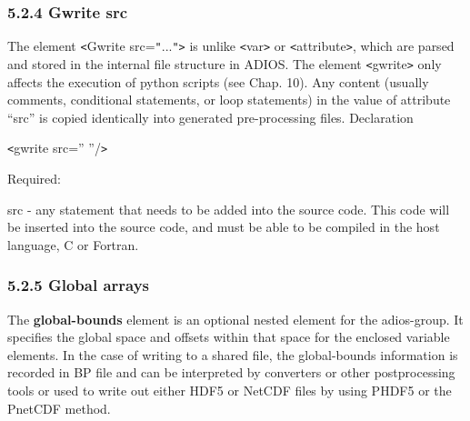 \vspace{10pt}
\subsubsection*{{\large \textbf{5.2.4 Gwrite src}}}

\vspace{10pt}
\leftskip=0pt
\parindent=0pt
The element \texttt{<}Gwrite src=\texttt{"}...\texttt{"}\texttt{>} is unlike \texttt{<}var\texttt{>} 
or \texttt{<}attribute\texttt{>}, which are parsed and stored in the internal file 
structure in ADIOS. The element \texttt{<}gwrite\texttt{>} only affects the execution 
of python scripts (see Chap. 10). Any content (usually comments, conditional statements, 
or loop statements) in the value of attribute ``src'' is copied identically into 
generated pre-processing files. Declaration

\vspace{10pt}
\texttt{<}gwrite src=''    ''/\texttt{>}

\vspace{10pt}
Required:

\vspace{10pt}
\leftskip=18pt
\parindent=3pt
src -  any statement that needs to be added into the source code. This code will 
be inserted into the source code, and must be able to be compiled in the host language, 
C or Fortran. \label{HToc84890247}\label{HToc212016623}\label{HToc212016865}\label{HRef278371183}\label{HToc182553370}

\vspace{10pt}
\subsubsection*{{\large \textbf{5.2.5 Global arrays}}}

\vspace{10pt}
\leftskip=0pt
\parindent=0pt
The \textbf{global-bounds} element is an optional nested element for the adios-group. 
It specifies the global space and offsets within that space for the enclosed variable 
elements. In the case of writing to a shared file, the global-bounds information 
is recorded in BP file and can be interpreted by converters or other postprocessing 
tools or used to write out either HDF5 or NetCDF files by using PHDF5 or the PnetCDF 
method.\label{HToc84890248}\label{HToc212016624}\label{HToc212016866}\label{HRef278371225}\label{HToc182553371}

\vspace{10pt}
